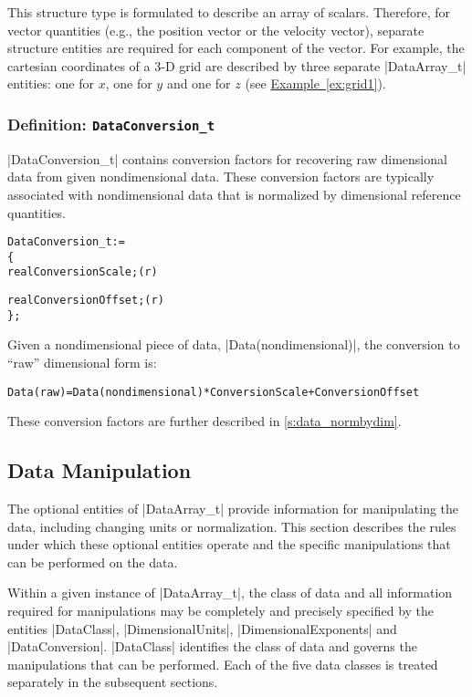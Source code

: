 This structure type is formulated to describe an array of scalars.
Therefore, for vector quantities (e.g., the position vector or the velocity
vector), separate structure entities are required for each component of the
vector.  For example, the cartesian coordinates of a 3-D grid are described
by three separate |DataArray_t| entities: one for $x$, one for $y$ and one
for $z$ (see \hyperref[ex:grid1]{Example~\ref*{ex:grid1}}).

\subsubsection{Definition: \texttt{DataConversion\_t}}
\label{s:DataConversion}

|DataConversion_t| contains conversion factors for recovering raw
dimensional data from given nondimensional data.
These conversion factors are typically associated with nondimensional
data that is normalized by dimensional reference quantities.
\begin{alltt}
  DataConversion\_t :=
    \{
    real ConversionScale ;                                                  (r)
    
    real ConversionOffset ;                                                 (r)
    \} ;
\end{alltt}
Given a nondimensional piece of data, |Data(nondimensional)|, the
conversion to ``raw'' dimensional form is:
\begin{alltt}
  Data(raw) = Data(nondimensional)*ConversionScale + ConversionOffset
\end{alltt}
These conversion factors are further described in \autoref{s:data_normbydim}. 

\subsection{Data Manipulation}
\label{s:data_manip}

The optional entities of |DataArray_t| provide information for manipulating
the data, including changing units or normalization.  This section describes
the rules under which these optional entities operate and the specific
manipulations that can be performed on the data.

Within a given instance of |DataArray_t|, the class of data and all
information required for manipulations may be completely and precisely
specified by the entities |DataClass|, |DimensionalUnits|,
|DimensionalExponents| and |DataConversion|.
|DataClass| identifies the class of data and governs the manipulations
that can be performed.
Each of the five data classes is treated separately in the subsequent
sections.

